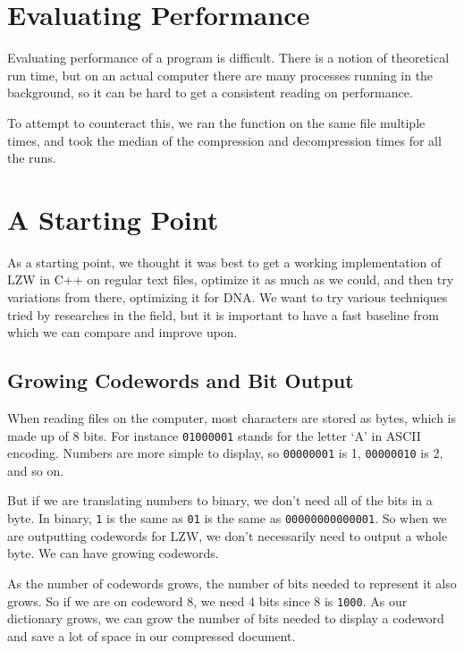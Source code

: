 \documentclass[12pt,twoside]{reedthesis}
\begin{document}
\hypertarget{evaluating-performance}{%
\section{Evaluating Performance}\label{evaluating-performance}}

Evaluating performance of a program is difficult. There is a notion of theoretical run time, but on an actual computer there are many processes running in the background, so it can be hard to get a consistent reading on performance.

To attempt to counteract this, we ran the function on the same file multiple times, and took the median of the compression and decompression times for all the runs.

\hypertarget{a-starting-point}{%
\section{A Starting Point}\label{a-starting-point}}

As a starting point, we thought it was best to get a working implementation of LZW in C++ on regular text files, optimize it as much as we could, and then try variations from there, optimizing it for DNA. We want to try various techniques tried by researches in the field, but it is important to have a fast baseline from which we can compare and improve upon.

\hypertarget{growing-codewords-and-bit-output}{%
\subsection{Growing Codewords and Bit Output}\label{growing-codewords-and-bit-output}}

When reading files on the computer, most characters are stored as bytes, which is made up of 8 bits. For instance \texttt{01000001} stands for the letter `A' in ASCII encoding. Numbers are more simple to display, so \texttt{00000001} is 1, \texttt{00000010} is 2, and so on.

But if we are translating numbers to binary, we don't need all of the bits in a byte. In binary, \texttt{1} is the same as \texttt{01} is the same as \texttt{00000000000001}. So when we are outputting codewords for LZW, we don't necessarily need to output a whole byte. We can have growing codewords.

As the number of codewords grows, the number of bits needed to represent it also grows. So if we are on codeword 8, we need 4 bits since 8 is \texttt{1000}. As our dictionary grows, we can grow the number of bits needed to display a codeword and save a lot of space in our compressed document.
\end{document}
